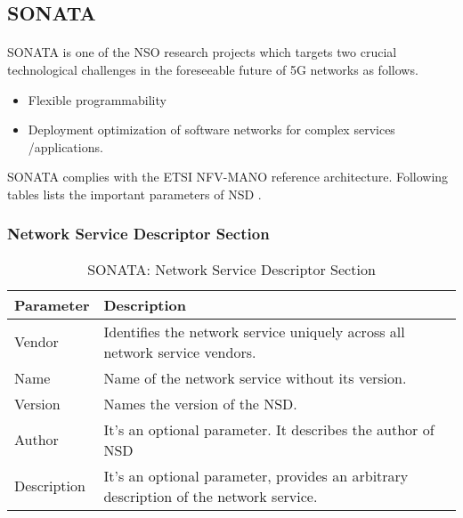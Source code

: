 \subsection{SONATA}
\label{SecSONATA}
\paragraph{}
SONATA is one of the NSO research projects which targets two crucial technological challenges in the foreseeable future of 5G networks as follows\cite{SONATA}.
\begin{itemize}
    \item Flexible programmability
    \item Deployment optimization of software networks for complex services /applications.
\end{itemize}
SONATA complies with the ETSI NFV-MANO reference architecture. Following tables lists the important parameters of NSD \cite{SONATASchemaDocumentation}.
\subsubsection{Network Service Descriptor Section}
    \begin{table}[h]
    \centering
    \begin{tabular}{ |p{4cm}|p{10cm}|}
        \hline
        \textbf{Parameter} & \textbf{Description} \\
        \hline
         
         Vendor & Identifies the network service uniquely across all network service vendors. \\
         \hline
         Name & Name of the network service without its version. \\
         \hline
         Version & Names the version of the NSD. \\
         \hline
         Author & It's an optional parameter. It describes the author of NSD \\
         \hline
         Description & It's an optional parameter, provides an arbitrary description of the network service. \\
         \hline
    \end{tabular}
    \caption{SONATA: Network Service Descriptor Section}
    \label{tab:SONATA_general_section}
\end{table}
